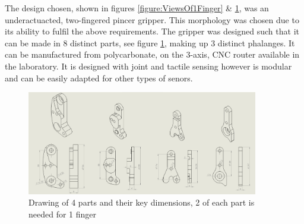 The design chosen, shown in figures \ref{figure:ViewsOf1Finger} \& \ref{fig:dimensions}, was an underactuacted, two-fingered pincer gripper. This morphology was chosen due to its ability to fulfil the above requirements. The gripper was designed such that it can be made in 8 distinct parts, see figure \ref{fig:dimensions}, making up 3 distinct phalanges. It can be manufactured from polycarbonate, on the 3-axis, CNC router available in the laboratory. It is designed with joint and tactile sensing however is modular and can be easily adapted for other types of senors. 

\begin{figure}
    \centering
    \includegraphics[width=0.9\textwidth]{Images/GripperDesign/dimensions.PNG}
    \caption{Drawing of 4 parts and their key dimensions, 2 of each part is needed for 1 finger}
    \label{fig:dimensions}
\end{figure}

